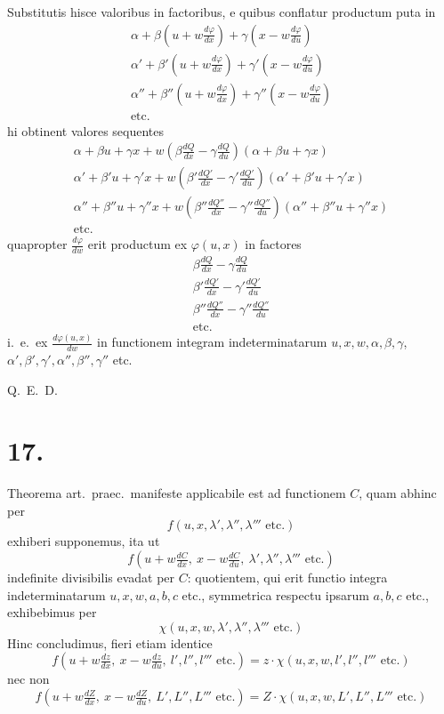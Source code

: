 \documentclass[12pt,a4paper]{article}
\theoremstyle{plain}
\begin{document}
Substitutis hisce valoribus in factoribus, e quibus conflatur productum
puta in
\begin{gather*}
\alpha + \beta(u + w\tfrac{d\varphi}{dx}) + \gamma(x - w\tfrac{d\varphi}{du}) \\
\alpha' + \beta'(u + w\tfrac{d\varphi}{dx}) + \gamma'(x - w\tfrac{d\varphi}{du}) \\
\alpha'' + \beta''(u + w\tfrac{d\varphi}{dx}) + \gamma''(x - w\tfrac{d\varphi}{du}) \\
\text{etc.}
\end{gather*}
hi obtinent valores sequentes
\begin{gather*}
\alpha + \beta u + \gamma x + w(\beta\tfrac{dQ}{dx} - \gamma\tfrac{dQ}{du})(\alpha + \beta u + \gamma x) \\
\alpha' + \beta' u + \gamma' x + w(\beta'\tfrac{dQ'}{dx} - \gamma'\tfrac{dQ'}{du})(\alpha' + \beta' u + \gamma' x) \\
\alpha'' + \beta'' u + \gamma'' x + w(\beta''\tfrac{dQ''}{dx} - \gamma''\tfrac{dQ''}{du})(\alpha'' + \beta'' u + \gamma'' x) \\
\text{etc.}
\end{gather*}
quapropter $\frac{d\varphi}{dw}$ erit productum ex $\varphi(u, x)$ in factores
\begin{gather*}
\beta\tfrac{dQ}{dx} - \gamma\tfrac{dQ}{du} \\
\beta'\tfrac{dQ'}{dx} - \gamma'\tfrac{dQ'}{du} \\
\beta''\tfrac{dQ''}{dx} - \gamma''\tfrac{dQ''}{du} \\
\text{etc.}
\end{gather*}
i.\ e.\ ex $\frac{d\varphi(u,x)}{dw}$ in functionem integram indeterminatarum $u, x, w, \alpha, \beta, \gamma$,
$\alpha', \beta', \gamma', \alpha'', \beta'', \gamma''$ etc.

\hfill Q.\ E.\ D.

\section*{17.}

Theorema art.\ praec.\ manifeste applicabile est ad functionem $C$, quam abhinc per
\[
f(u, x, \lambda', \lambda'', \lambda''' \text{ etc.})
\]
exhiberi supponemus, ita ut
\[
f(u + w\tfrac{dC}{dx},\ x - w\tfrac{dC}{du},\ \lambda', \lambda'', \lambda''' \text{ etc.})
\]
indefinite divisibilis evadat per $C$: quotientem, qui erit functio integra indeterminatarum $u, x, w, a, b, c$ etc., symmetrica respectu ipsarum $a, b, c$ etc., exhibebimus per
\[
\chi(u, x, w, \lambda', \lambda'', \lambda''' \text{ etc.})
\]
Hinc concludimus, fieri etiam identice
\[
f(u + w\tfrac{dz}{dx},\ x - w\tfrac{dz}{du},\ l', l'', l''' \text{ etc.}) = z \cdot \chi(u, x, w, l', l'', l''' \text{ etc.})
\]
nec non
\[
f(u + w\tfrac{dZ}{dx},\ x - w\tfrac{dZ}{du},\ L', L'', L''' \text{ etc.}) = Z \cdot \chi(u, x, w, L', L'', L''' \text{ etc.})
\]
\end{document}
